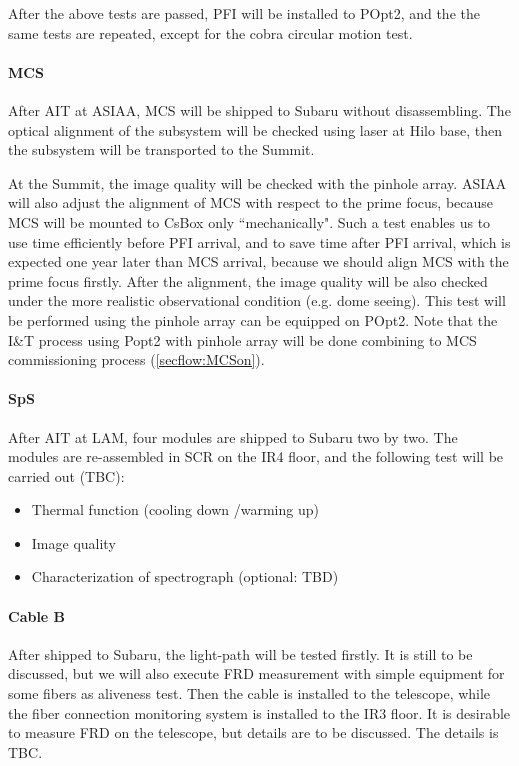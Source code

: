 After the above tests are passed, PFI will be installed to POpt2, and the the same tests are repeated, except for the cobra circular motion test.


\paragraph{MCS}
After AIT at ASIAA, MCS will be shipped to Subaru without disassembling.
The optical alignment of the subsystem will be checked using laser at Hilo base, then the subsystem will be transported to the Summit.

At the Summit, the image quality will be checked with the pinhole array.
ASIAA will also adjust the alignment of MCS with respect to the prime focus, because MCS will be mounted to CsBox only ``mechanically".
Such a test enables us to use time efficiently before PFI arrival, and to save time after PFI arrival, which is expected one year later than MCS arrival, because we should align MCS with the prime focus firstly.
After the alignment, the image quality will be also checked under the more realistic observational condition (e.g. dome seeing).
This test will be performed using the pinhole array can be equipped on POpt2.
Note that the I\&T process using Popt2 with pinhole array will be done combining to MCS commissioning process (\ref{secflow:MCSon}).



\paragraph{SpS}
After AIT at LAM, four modules are shipped to Subaru two by two.
The modules are re-assembled in SCR on the IR4 floor, and the following test will be carried out (TBC):
\begin{itemize}
\item Thermal function (cooling down /warming up)
\item Image quality
\item Characterization of spectrograph  (optional: TBD)
\end{itemize}


\paragraph{Cable B}
After shipped to Subaru, the light-path will be tested firstly. 
It is still to be discussed, but we will also execute FRD measurement with simple equipment for some fibers as aliveness test.
Then the cable is installed to the telescope, while the fiber connection monitoring system is installed to the IR3 floor.
It is desirable to measure FRD on the telescope, but details are to be discussed.
The details is TBC.

